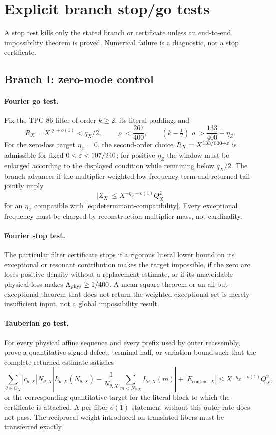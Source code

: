 \section{Explicit branch stop/go tests}
\label{sec:stop-go-tests}

A stop test kills only the stated branch or certificate unless an
end-to-end impossibility theorem is proved.  Numerical failure is a
diagnostic, not a stop certificate.

\subsection{Branch I: zero-mode control}

\paragraph{Fourier go test.}
Fix the TPC-86 filter of order \(k\ge2\), its literal padding, and
\[
 R_X=X^{\varrho+o(1)}<q_X/2,\qquad
 \varrho<\frac{267}{400},\qquad
 (k-\tfrac12)\varrho>\frac{133}{400}+\eta_Z.
\]
For the zero-loss target \(\eta_Z=0\), the second-order choice
\(R_X=X^{133/600+\varepsilon}\) is admissible for fixed
\(0<\varepsilon<107/240\); for positive \(\eta_Z\) the window must be
enlarged according to the displayed condition while remaining below
\(q_X/2\).
The branch advances if the multiplier-weighted low-frequency term and
returned tail jointly imply
\[
 |Z_X|\le X^{-\eta_Z+o(1)}Q_X^2
\]
for an \(\eta_Z\) compatible with
\eqref{eq:determinant-compatibility}.  Every exceptional frequency
must be charged by reconstruction-multiplier mass, not cardinality.

\paragraph{Fourier stop test.}
The particular filter certificate stops if a rigorous literal lower
bound on its exceptional or resonant contribution makes the target
impossible, if the zero arc loses positive density without a
replacement estimate, or if its unavoidable physical loss makes
\(\Lambda_{\rm phys}\ge1/400\).  A mean-square theorem or an
all-but-exceptional theorem that does not return the weighted
exceptional set is merely insufficient input, not a global
impossibility result.

\paragraph{Tauberian go test.}
For every physical affine sequence and every prefix used by outer
reassembly, prove a quantitative signed defect, terminal-half, or
variation bound such that the complete returned estimate satisfies
\[
 \sum_{\theta\in\Theta_X}|c_{\theta,X}|N_{\theta,X}
 \left|
 L_{\theta,X}(N_{\theta,X})
 -\frac1{N_{\theta,X}}\sum_{m<N_{\theta,X}}
 L_{\theta,X}(m)
 \right|
 +|E_{\mathrm{content},X}|
 \le X^{-\eta_Z+o(1)}Q_X^2,
\]
or the corresponding quantitative target for the literal block to
which the certificate is attached.  A per-fiber \(o(1)\) statement
without this outer rate does not pass.  The reciprocal weight
introduced on translated fibers must be transferred exactly.

